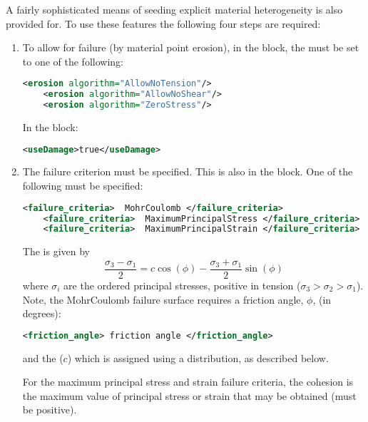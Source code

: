 A fairly sophisticated means of seeding explicit material heterogeneity is also provided for. 
To use these features the following four steps are required: 
\begin{enumerate}
\item {} 
  To allow for failure (by material point erosion), in the  block, the 
   must be set to one of the following: 
  \begin{lstlisting}[language=XML]
    <erosion algorithm="AllowNoTension"/>
    <erosion algorithm="AllowNoShear"/>
    <erosion algorithm="ZeroStress"/>
  \end{lstlisting}
  In the  block:
  \begin{lstlisting}[language=XML]
    <useDamage>true</useDamage>
  \end{lstlisting}

\item {} 
  The failure criterion must be specified.  This is also in the 
  block.  One of the following must be specified:
  \begin{lstlisting}[language=XML]
    <failure_criteria>  MohrCoulomb </failure_criteria>
    <failure_criteria>  MaximumPrincipalStress </failure_criteria>
    <failure_criteria>  MaximumPrincipalStrain </failure_criteria>
  \end{lstlisting}

  The  is given by 
  \begin{equation}
  \frac{\sigma_3-\sigma_1}{2}=c\cos(\phi)-\frac{\sigma_3+\sigma_1}{2}\sin(\phi)
  \end{equation}
  where $\sigma_i$ are the ordered principal stresses, positive in tension 
  ($\sigma_3 > \sigma_2 > \sigma_1$).  Note, the MohrCoulomb failure 
  surface requires a friction angle, $\phi$, (in degrees):
  \begin{lstlisting}[language=XML]
    <friction_angle> friction angle </friction_angle>
  \end{lstlisting}
  and the  ($c$) which is assigned using a distribution, as described below.  

  \begin{NoteBox}
  For the maximum 
  principal stress and strain failure criteria, the cohesion is the maximum value of principal 
  stress or strain that may be obtained (must be positive).  
  \end{NoteBox}


\end{enumerate}
